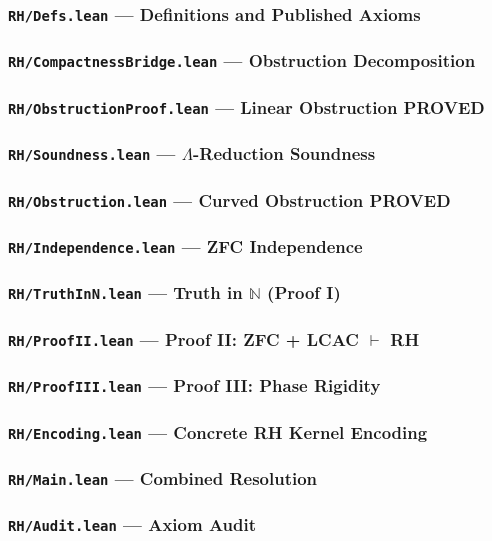 \subsubsection*{\texttt{RH/Defs.lean} --- Definitions and Published Axioms}


\subsubsection*{\texttt{RH/CompactnessBridge.lean} --- Obstruction Decomposition}


\subsubsection*{\texttt{RH/ObstructionProof.lean} --- Linear Obstruction PROVED}


\subsubsection*{\texttt{RH/Soundness.lean} --- $\Lambda$-Reduction Soundness}


\subsubsection*{\texttt{RH/Obstruction.lean} --- Curved Obstruction PROVED}


\subsubsection*{\texttt{RH/Independence.lean} --- ZFC Independence}


\subsubsection*{\texttt{RH/TruthInN.lean} --- Truth in $\mathbb{N}$ (Proof I)}


\subsubsection*{\texttt{RH/ProofII.lean} --- Proof II: ZFC + LCAC $\vdash$ RH}


\subsubsection*{\texttt{RH/ProofIII.lean} --- Proof III: Phase Rigidity}


\subsubsection*{\texttt{RH/Encoding.lean} --- Concrete RH Kernel Encoding}


\subsubsection*{\texttt{RH/Main.lean} --- Combined Resolution}


\subsubsection*{\texttt{RH/Audit.lean} --- Axiom Audit}

